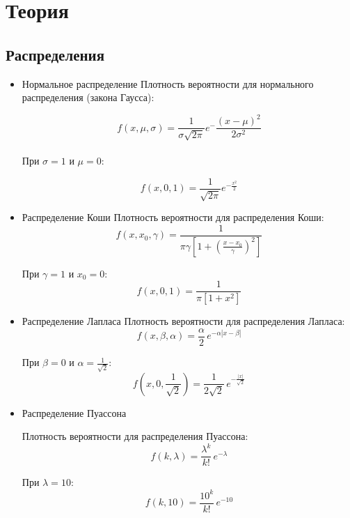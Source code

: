\section{Теория}
\subsection{Распределения}
\begin{itemize}
\item{Нормальное распределение}
Плотность вероятности для нормального распределения (закона Гаусса):

\begin{equation}
  f(x, \mu, \sigma) = \frac{1}{{\sigma \sqrt {2\pi } }}e^-\frac{ \left( {x - \mu } \right)^2 } {2\sigma ^2 }
\end{equation}
 \\

При \( \sigma = 1 \) и \( \mu = 0 \):

\begin{equation}
  f(x, 0, 1) = \frac{1}{ \sqrt {2\pi } }e^{-\frac{{x}^2 }{2}}
\end{equation}


\item{Распределение Коши}
Плотность вероятности для распределения Коши:
$$
f(x, {x_0}, \gamma) =  \frac{1}{\pi\gamma \left[1 + \left(\frac{x-x_0}{\gamma}\right)^2\right]}
$$

При \( \gamma = 1 \) и \( x_0 = 0 \):
$$
f(x, 0, 1) =  \frac{1}{\pi \left[1 + {x}^2\right]}
$$


\item{Распределение Лапласа}
Плотность вероятности для распределения Лапласа:
\begin{equation} 
f(x, \beta, \alpha) = \frac{\alpha}{2} \, e^{-\alpha|x - \beta|}
\end{equation}

При \( \beta = 0 \) и \( \alpha = \frac{1}{\sqrt{2}} \):
\begin{equation} 
f(x, 0, \frac{1}{\sqrt{2}}) = \frac{1}{2\sqrt{2}} \, e^{-\frac{|x|}{\sqrt{2}}}
\end{equation}


\item{Распределение Пуассона}

Плотность вероятности для распределения Пуассона:
\begin{equation} 
f(k, \lambda) = \frac{\lambda^k}{k!}\, e^{-\lambda}
\end{equation}

При \( \lambda = 10 \):
\begin{equation} 
f(k, 10) = \frac{10^k}{k!}\, e^{-10}
\end{equation}


\end{itemize}
